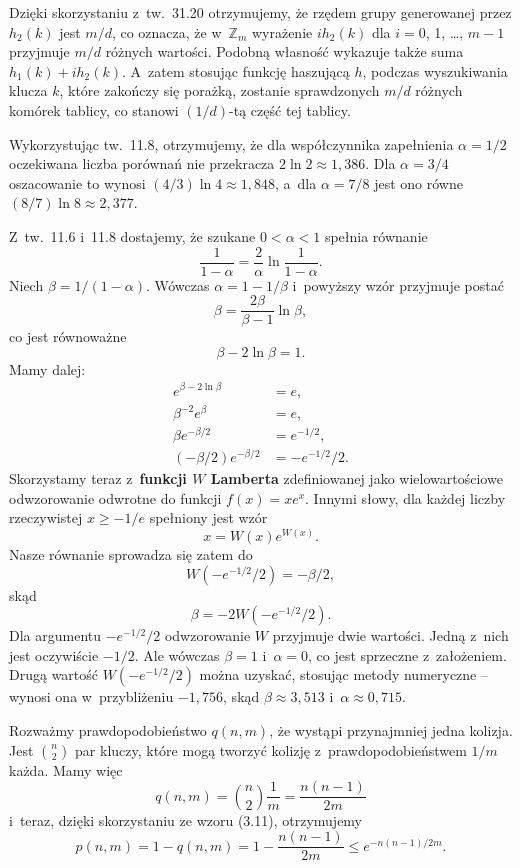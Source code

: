 \exercise %
Dzięki skorzystaniu z~tw.\ 31.20 otrzymujemy, że rzędem grupy generowanej przez $h_2(k)$ jest $m/d$, co oznacza, że w~$\mathbb{Z}_m$ wyrażenie $ih_2(k)$ dla $i=0$, 1, \dots, $m-1$ przyjmuje $m/d$ różnych wartości.
Podobną własność wykazuje także suma $h_1(k)+ih_2(k)$.
A~zatem stosując funkcję haszującą $h$, podczas wyszukiwania klucza $k$, które zakończy się porażką, zostanie sprawdzonych $m/d$ różnych komórek tablicy, co stanowi $(1/d)$-tą część tej tablicy.

\exercise %
Wykorzystując tw.\ 11.8, otrzymujemy, że dla współczynnika zapełnienia $\alpha=1/2$ oczekiwana liczba porównań nie przekracza $2\ln2\approx1{,}386$.
Dla $\alpha=3/4$ oszacowanie to wynosi $(4/3)\ln4\approx1{,}848$, a~dla $\alpha=7/8$ jest ono równe $(8/7)\ln8\approx2{,}377$.

\exercise %
Z~tw.\ 11.6 i~11.8 dostajemy, że szukane $0<\alpha<1$ spełnia równanie
\[
	\frac{1}{1-\alpha} = \frac{2}{\alpha}\ln\frac{1}{1-\alpha}.
\]
Niech $\beta=1/(1-\alpha)$.
Wówczas $\alpha=1-1/\beta$ i~powyższy wzór przyjmuje postać
\[
	\beta = \frac{2\beta}{\beta-1}\ln\beta,
\]
co jest równoważne
\[
	\beta-2\ln\beta = 1.
\]
Mamy dalej:
\begin{align*}
	e^{\beta-2\ln\beta} &= e, \\
	\beta^{-2}e^\beta &= e, \\
	\beta e^{-\beta/2} &= e^{-1/2}, \\
	(-\beta/2)e^{-\beta/2} &= -e^{-1/2}\!/2.
\end{align*}
Skorzystamy teraz z~\textbf{funkcji $W$ Lamberta} \cite{lambertwfunction} zdefiniowanej jako wielowartościowe odwzorowanie odwrotne do funkcji $f(x)=xe^x$.
Innymi słowy, dla każdej liczby rzeczywistej $x\ge-1/e$ spełniony jest wzór
\[
	x = W(x)e^{W(x)}.
\]
Nasze równanie sprowadza się zatem do
\[
	W(-e^{-1/2}\!/2) = -\beta/2,
\]
skąd
\[
	\beta = -2W(-e^{-1/2}\!/2).
\]
Dla argumentu $-e^{-1/2}\!/2$ odwzorowanie $W$ przyjmuje dwie wartości.
Jedną z~nich jest oczywiście $-1/2$.
Ale wówczas $\beta=1$ i~$\alpha=0$, co jest sprzeczne z~założeniem.
Drugą wartość $W(-e^{-1/2}\!/2)$ można uzyskać, stosując metody numeryczne -- wynosi ona w~przybliżeniu $-1{,}756$, skąd $\beta\approx3{,}513$ i~$\alpha\approx0{,}715$.


\exercise %

\noindent Rozważmy prawdopodobieństwo $q(n,m)$, że wystąpi przynajmniej jedna kolizja.
Jest $\binom{n}{2}$ par kluczy, które mogą tworzyć kolizję z~prawdopodobieństwem $1/m$ każda.
Mamy więc
\[
	q(n,m) = \binom{n}{2}\frac{1}{m} = \frac{n(n-1)}{2m}
\]
i~teraz, dzięki skorzystaniu ze wzoru (3.11), otrzymujemy
\[
	p(n,m) = 1-q(n,m) = 1-\frac{n(n-1)}{2m} \le e^{-n(n-1)/2m}.
\]

